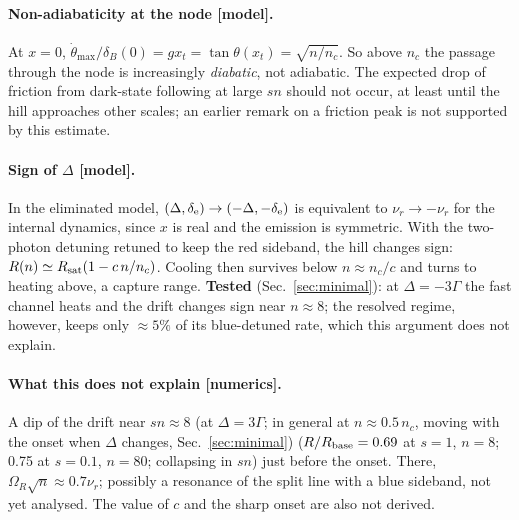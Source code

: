\documentclass[11pt,a4paper]{article}
\newcommand{\Om}{\Omega}
\newcommand{\nur}{\nu_r}
\begin{document}
\paragraph{Non-adiabaticity at the node [model].} At $x=0$, $\dot\theta_{\max}/\delta_B(0)=gx_t=\tan\theta(x_t)=\sqrt{n/n_c}$. So above $n_c$ the passage through the node is increasingly \emph{diabatic}, not adiabatic. The expected drop of friction from dark-state following at large $sn$ should not occur, at least until the hill approaches other scales; an earlier remark on a friction peak is not supported by this estimate.

\paragraph{Sign of $\Delta$ [model].} In the eliminated model, $(\Delta,\delta_{\rm e})\to(-\Delta,-\delta_{\rm e})$ is equivalent to $\nur\to-\nur$ for the internal dynamics, since $x$ is real and the emission is symmetric. With the two-photon detuning retuned to keep the red sideband, the hill changes sign: $R(n)\simeq R_{\rm sat}(1-c\,n/n_c)$. Cooling then survives below $n\approx n_c/c$ and turns to heating above, a capture range. \textbf{Tested} (Sec.~\ref{sec:minimal}): at $\Delta=-3\Gamma$ the fast channel heats and the drift changes sign near $n\approx8$; the resolved regime, however, keeps only $\approx5\%$ of its blue-detuned rate, which this argument does not explain.

\paragraph{What this does not explain [numerics].} A dip of the drift near $sn\approx8$ (at $\Delta=3\Gamma$; in general at $n\approx0.5\,n_c$, moving with the onset when $\Delta$ changes, Sec.~\ref{sec:minimal}) ($R/R_{\rm base}=0.69$ at $s=1$, $n=8$; 0.75 at $s=0.1$, $n=80$; collapsing in $sn$) just before the onset. There, $\Om_R\sqrt n\approx0.7\nur$; possibly a resonance of the split line with a blue sideband, not yet analysed. The value of $c$ and the sharp onset are also not derived.
\end{document}
